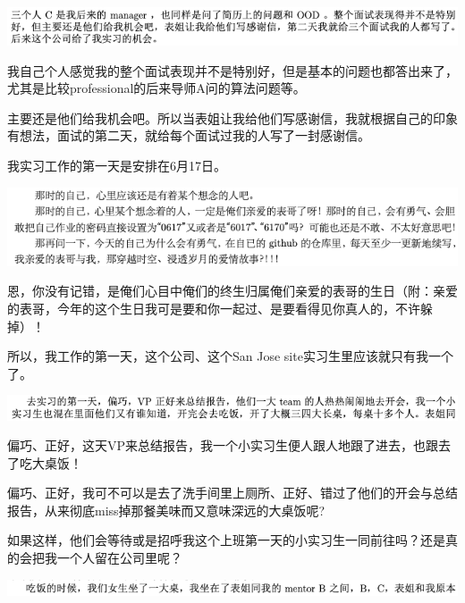 \documentclass[9pt, b5paper]{article}
\begin{document}
\begin{center}
\includegraphics[width=.9\linewidth]{./pic/backups_plans_20210504_210135.png}
\end{center}

我自己个人感觉我的整个面试表现并不是特别好，但是基本的问题也都答出来了，尤其是比较professional的后来导师A问的算法问题等。

主要还是他们给我机会吧。所以当表姐让我给他们写感谢信，我就根据自己的印象有想法，面试的第二天，就给每个面试过我的人写了一封感谢信。

我实习工作的第一天是安排在6月17日。

\begin{center}
\includegraphics[width=.9\linewidth]{./pic/backups_plans_20210504_210709.png}
\end{center}

恩，你没有记错，是俺们心目中俺们的终生归属俺们亲爱的表哥的生日（附：亲爱的表哥，今年的这个生日我可是要和你一起过、是要看得见你真人的，不许躲掉）！

所以，我工作的第一天，这个公司、这个San Jose site实习生里应该就只有我一个了。

\begin{center}
\includegraphics[width=.9\linewidth]{./pic/backups_plans_20210504_210919.png}
\end{center}

偏巧、正好，这天VP来总结报告，我一个小实习生便人跟人地跟了进去，也跟去了吃大桌饭！

偏巧、正好，我可不可以是去了洗手间里上厕所、正好、错过了他们的开会与总结报告，从来彻底miss掉那餐美味而又意味深远的大桌饭呢?

如果这样，他们会等待或是招呼我这个上班第一天的小实习生一同前往吗？还是真的会把我一个人留在公司里呢？

\begin{center}
\includegraphics[width=.9\linewidth]{./pic/backups_plans_20210504_211249.png}
\end{center}
\end{document}
